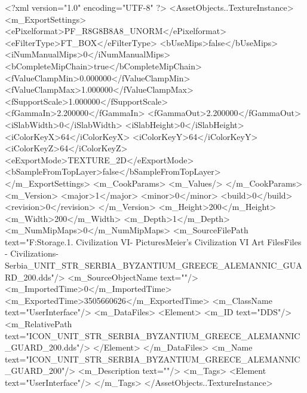 <?xml version="1.0" encoding="UTF-8" ?>
<AssetObjects..TextureInstance>
	<m_ExportSettings>
		<ePixelformat>PF_R8G8B8A8_UNORM</ePixelformat>
		<eFilterType>FT_BOX</eFilterType>
		<bUseMips>false</bUseMips>
		<iNumManualMips>0</iNumManualMips>
		<bCompleteMipChain>true</bCompleteMipChain>
		<fValueClampMin>0.000000</fValueClampMin>
		<fValueClampMax>1.000000</fValueClampMax>
		<fSupportScale>1.000000</fSupportScale>
		<fGammaIn>2.200000</fGammaIn>
		<fGammaOut>2.200000</fGammaOut>
		<iSlabWidth>0</iSlabWidth>
		<iSlabHeight>0</iSlabHeight>
		<iColorKeyX>64</iColorKeyX>
		<iColorKeyY>64</iColorKeyY>
		<iColorKeyZ>64</iColorKeyZ>
		<eExportMode>TEXTURE_2D</eExportMode>
		<bSampleFromTopLayer>false</bSampleFromTopLayer>
	</m_ExportSettings>
	<m_CookParams>
		<m_Values/>
	</m_CookParams>
	<m_Version>
		<major>1</major>
		<minor>0</minor>
		<build>0</build>
		<revision>0</revision>
	</m_Version>
	<m_Height>200</m_Height>
	<m_Width>200</m_Width>
	<m_Depth>1</m_Depth>
	<m_NumMipMaps>0</m_NumMipMaps>
	<m_SourceFilePath text="F:\Mod Storage\2.1. Civilization VI\Mods\Archive - Pictures\Sid Meier's Civilization VI Art Files\Art Files - Civilizations\Civilization - Serbia\ICON_UNIT_STR_SERBIA_BYZANTIUM_GREECE_ALEMANNIC_GUARD_200.dds"/>
	<m_SourceObjectName text=""/>
	<m_ImportedTime>0</m_ImportedTime>
	<m_ExportedTime>3505660626</m_ExportedTime>
	<m_ClassName text="UserInterface"/>
	<m_DataFiles>
		<Element>
			<m_ID text="DDS"/>
			<m_RelativePath text="ICON_UNIT_STR_SERBIA_BYZANTIUM_GREECE_ALEMANNIC_GUARD_200.dds"/>
		</Element>
	</m_DataFiles>
	<m_Name text="ICON_UNIT_STR_SERBIA_BYZANTIUM_GREECE_ALEMANNIC_GUARD_200"/>
	<m_Description text=""/>
	<m_Tags>
		<Element text="UserInterface"/>
	</m_Tags>
</AssetObjects..TextureInstance>

